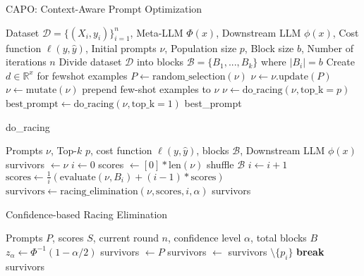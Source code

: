 \begin{algorithm}
    \caption{CAPO: Context-Aware Prompt Optimization}
    \begin{algorithmic}[1]
    \Require Dataset $\mathcal{D} = \{(X_i, y_i)\}_{i=1}^n$, Meta-LLM $\Phi(x)$, Downstream LLM $\phi(x)$, Cost function $\ell(y, \hat{y})$, Initial prompts $\nu$, Population size $p$, Block size $b$, Number of iterations $n$
    \State Divide dataset $\mathcal{D}$ into blocks $\mathcal{B} = \{B_1, ..., B_k\}$ where $|B_i| = b$
    \State Create $d \in \mathbb{R}^x$ for fewshot examples
        \State $P \gets \text{random\_selection}(\nu)$
        \State $\nu \gets \nu.\text{update}(P)$
        \State $\nu \gets \text{mutate}(\nu)$
        \State prepend few-shot examples to $\nu$
        \State $\nu \gets \text{do\_racing}(\nu, \text{top\_k}=p)$
    \EndFor
    \State $\text{best\_prompt} \gets \text{do\_racing}(\nu, \text{top\_k}=1)$
    \State \Return best\_prompt
    \end{algorithmic}
\end{algorithm}

\begin{algorithm}
    \caption{do\_racing}
    \begin{algorithmic}[1]
    \Require Prompts $\nu$, Top-$k$ $p$, cost function $\ell(y, \hat{y})$, blocks $\mathcal{B}$, Downstream LLM $\phi(x)$
    \State survivors $\gets \nu$
    \State $i \gets 0$
    \State scores $\gets [0]*\text{len}(\nu)$
    \State shuffle $\mathcal{B}$
        \State $i \gets i + 1$
        \State $\text{scores} \gets \frac{1}{i}\left(\text{evaluate}(\nu, B_i) + (i-1)*\text{scores}\right)$
        \State $\text{survivors} \gets \text{racing\_elimination}(\nu, \text{scores}, i, \alpha)$
    \EndWhile 
    \State \Return survivors
    \end{algorithmic}
\end{algorithm}

\begin{algorithm}
    \caption{Confidence-based Racing Elimination}
    \begin{algorithmic}[1]
    \Require Prompts $P$, scores $S$, current round $n$, confidence level $\alpha$, total blocks $B$
    \State $z_{\alpha} \gets \Phi^{-1}(1-\alpha/2)$ 
    \State survivors $\gets P$
                \State survivors $\gets$ survivors $\setminus \{p_i\}$
                \State \textbf{break}
            \EndIf
        \EndFor
    \EndFor
    \State \Return survivors
    \end{algorithmic}
\end{algorithm}
